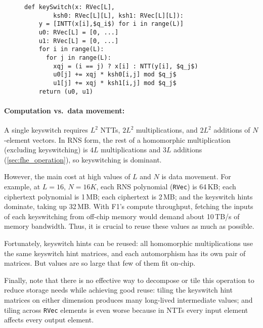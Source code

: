\begin{figure}
\begin{center}
  \begin{lstlisting}[caption={Standard keyswitch implementation. \texttt{RVec} is an $N$-element vector of 32-bit values, storing a single RNS polynomial in either the coefficient or the NTT domain.
    }, mathescape=true, style=custompython, label=listing:keyswitch]
  def keySwitch(x: RVec[L],
        ksh0: RVec[L][L], ksh1: RVec[L][L]):
    y = [INTT(x[i],$q_i$) for i in range(L)]
    u0: RVec[L] = [0, ...]
    u1: RVec[L] = [0, ...]
    for i in range(L):
      for j in range(L):
        xqj = (i == j) ? x[i] : NTT(y[i], $q_j$)
        u0[j] += xqj * ksh0[i,j] mod $q_j$
        u1[j] += xqj * ksh1[i,j] mod $q_j$
    return (u0, u1)
  \end{lstlisting}
\end{center}
\end{figure}


\paragraph{Computation vs.\ data movement:}
A single keyswitch requires $L^2$ NTTs, $2L^2$ multiplications, and $2L^2$
additions of $N$-element \mbox{vectors}. In RNS form, the rest of a homomorphic
multiplication (excluding keyswitching) is $4L$ multiplications and $3L$
additions (\autoref{sec:fhe_operation}), so keyswitching is dominant.

However, the main cost at high values of $L$ and $N$ is data movement. For
example, at $L = 16$, $N = 16K$, each RNS polynomial (\texttt{RVec}) is 64\,KB;
each ciphertext polynomial is 1\,MB; each ciphertext is 2\,MB; and the
keyswitch hints dominate, taking up 32\,MB. With F1's compute throughput,
fetching the inputs of each keyswitching from off-chip memory would demand
about 10\,TB/s of memory bandwidth. Thus, it is crucial to reuse these values
as much as possible.

Fortunately, keyswitch hints can be reused: all homomorphic multiplications
use the same keyswitch hint matrices, and each automorphism has its own pair
of matrices. But values are so large that few of them fit on-chip.

Finally, note that there is no effective way to decompose or tile this
operation to reduce storage needs while achieving good reuse: tiling the
keyswitch hint matrices on either dimension produces many long-lived
intermediate values; and tiling across \texttt{RVec} elements is even worse
because in NTTs every input element affects every output element.

